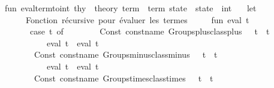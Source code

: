 \begin{isabellebody}
fun\ eval{\isacharunderscore}{\kern0pt}term{\isacharunderscore}{\kern0pt}to{\isacharunderscore}{\kern0pt}int\ {\isacharparenleft}{\kern0pt}thy\ {\isacharcolon}{\kern0pt}\ theory{\isacharparenright}{\kern0pt}\ {\isacharparenleft}{\kern0pt}term\ {\isacharcolon}{\kern0pt}\ term{\isacharparenright}{\kern0pt}\ {\isacharparenleft}{\kern0pt}state\ {\isacharcolon}{\kern0pt}\ state{\isacharparenright}{\kern0pt}\ {\isacharcolon}{\kern0pt}\ int\ {\isacharequal}{\kern0pt}\isanewline
\ \ let\isanewline
\ \ \ \ {\isacharparenleft}{\kern0pt}{\isacharasterisk}{\kern0pt}\ Fonction\ récursive\ pour\ évaluer\ les\ termes\ {\isacharasterisk}{\kern0pt}{\isacharparenright}{\kern0pt}\isanewline
\ \ \ \ fun\ eval\ t\ {\isacharequal}{\kern0pt}\isanewline
\ \ \ \ \ \ case\ t\ of\isanewline
\ \ \ \ \ \ \ \ Const\ {\isacharparenleft}{\kern0pt}{\isacharat}{\kern0pt}{\isacharbraceleft}{\kern0pt}const{\isacharunderscore}{\kern0pt}name\ {\isachardoublequote}{\kern0pt}Groups{\isachardot}{\kern0pt}plus{\isacharunderscore}{\kern0pt}class{\isachardot}{\kern0pt}plus{\isachardoublequote}{\kern0pt}{\isacharbraceright}{\kern0pt}{\isacharcomma}{\kern0pt}\ {\isacharunderscore}{\kern0pt}{\isacharparenright}{\kern0pt}\ {\isachardollar}{\kern0pt}\ t{}\ {\isachardollar}{\kern0pt}\ t{}\ {\isacharequal}{\kern0pt}{\isachargreater}{\kern0pt}\isanewline
\ \ \ \ \ \ \ \ \ \ {\isacharparenleft}{\kern0pt}eval\ t{}{\isacharparenright}{\kern0pt}\ {\isacharplus}{\kern0pt}\ {\isacharparenleft}{\kern0pt}eval\ t{}{\isacharparenright}{\kern0pt}\isanewline
\ \ \ \ \ \ {\isacharbar}{\kern0pt}\ Const\ {\isacharparenleft}{\kern0pt}{\isacharat}{\kern0pt}{\isacharbraceleft}{\kern0pt}const{\isacharunderscore}{\kern0pt}name\ {\isachardoublequote}{\kern0pt}Groups{\isachardot}{\kern0pt}minus{\isacharunderscore}{\kern0pt}class{\isachardot}{\kern0pt}minus{\isachardoublequote}{\kern0pt}{\isacharbraceright}{\kern0pt}{\isacharcomma}{\kern0pt}\ {\isacharunderscore}{\kern0pt}{\isacharparenright}{\kern0pt}\ {\isachardollar}{\kern0pt}\ t{}\ {\isachardollar}{\kern0pt}\ t{}\ {\isacharequal}{\kern0pt}{\isachargreater}{\kern0pt}\isanewline
\ \ \ \ \ \ \ \ \ \ {\isacharparenleft}{\kern0pt}eval\ t{}{\isacharparenright}{\kern0pt}\ {\isacharminus}{\kern0pt}\ {\isacharparenleft}{\kern0pt}eval\ t{}{\isacharparenright}{\kern0pt}\isanewline
\ \ \ \ \ \ {\isacharbar}{\kern0pt}\ Const\ {\isacharparenleft}{\kern0pt}{\isacharat}{\kern0pt}{\isacharbraceleft}{\kern0pt}const{\isacharunderscore}{\kern0pt}name\ {\isachardoublequote}{\kern0pt}Groups{\isachardot}{\kern0pt}times{\isacharunderscore}{\kern0pt}class{\isachardot}{\kern0pt}times{\isachardoublequote}{\kern0pt}{\isacharbraceright}{\kern0pt}{\isacharcomma}{\kern0pt}\ {\isacharunderscore}{\kern0pt}{\isacharparenright}{\kern0pt}\ {\isachardollar}{\kern0pt}\ t{}\ {\isachardollar}{\kern0pt}\ t{}\ {\isacharequal}{\kern0pt}{\isachargreater}{\kern0pt}\isanewline

\end{isabellebody}
